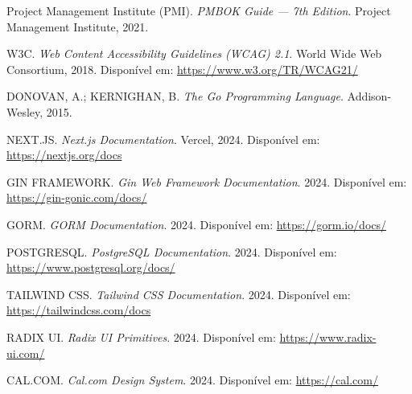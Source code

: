 \documentclass[a4paper,12pt,oneside]{article}
\begin{document}
\begin{enumerate}[leftmargin=2cm, label={[\arabic*]}]
  \item Project Management Institute (PMI). \textit{PMBOK Guide --- 7th Edition}. Project Management Institute, 2021.
  \item W3C. \textit{Web Content Accessibility Guidelines (WCAG) 2.1}. World Wide Web Consortium, 2018. Disponível em: \url{https://www.w3.org/TR/WCAG21/}
  \item DONOVAN, A.; KERNIGHAN, B. \textit{The Go Programming Language}. Addison-Wesley, 2015.
  \item NEXT.JS. \textit{Next.js Documentation}. Vercel, 2024. Disponível em: \url{https://nextjs.org/docs}
  \item GIN FRAMEWORK. \textit{Gin Web Framework Documentation}. 2024. Disponível em: \url{https://gin-gonic.com/docs/}
  \item GORM. \textit{GORM Documentation}. 2024. Disponível em: \url{https://gorm.io/docs/}
  \item POSTGRESQL. \textit{PostgreSQL Documentation}. 2024. Disponível em: \url{https://www.postgresql.org/docs/}
  \item TAILWIND CSS. \textit{Tailwind CSS Documentation}. 2024. Disponível em: \url{https://tailwindcss.com/docs}
  \item RADIX UI. \textit{Radix UI Primitives}. 2024. Disponível em: \url{https://www.radix-ui.com/}
  \item CAL.COM. \textit{Cal.com Design System}. 2024. Disponível em: \url{https://cal.com/}
\end{enumerate}
\end{document}
